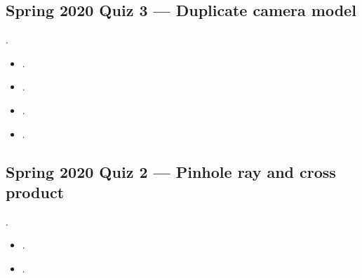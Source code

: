 \documentclass[letterpaper,11pt,english,openany,oneside]{jupyterBook}
\begin{document}
\subsection{Spring 2020 Quiz 3 — Duplicate camera model}
\label{\detokenize{reference/quiz-index:spring-2020-quiz-3-duplicate-camera-model}}
\sphinxAtStartPar
{} .
\begin{itemize}
\item {}
\sphinxAtStartPar
{\hyperref[\detokenize{lectures/lecture03/quiz-workbook:quiz-11-q1}]{}}.

\item {}
\sphinxAtStartPar
{\hyperref[\detokenize{lectures/lecture03/quiz-workbook:quiz-11-q2}]{}}.

\item {}
\sphinxAtStartPar
{\hyperref[\detokenize{lectures/lecture03/quiz-workbook:quiz-11-q3}]{}}.

\item {}
\sphinxAtStartPar
{\hyperref[\detokenize{lectures/lecture03/quiz-workbook:quiz-11-q4}]{}}.

\end{itemize}


\subsection{Spring 2020 Quiz 2 — Pinhole ray and cross product}
\label{\detokenize{reference/quiz-index:spring-2020-quiz-2-pinhole-ray-and-cross-product}}
\sphinxAtStartPar
{} .
\begin{itemize}
\item {}
\sphinxAtStartPar
{\hyperref[\detokenize{lectures/lecture03/quiz-workbook:quiz-14-q1}]{}}.

\item {}
\sphinxAtStartPar
{\hyperref[\detokenize{lectures/lecture03/quiz-workbook:quiz-14-q2}]{}}.

\end{itemize}
\end{document}

